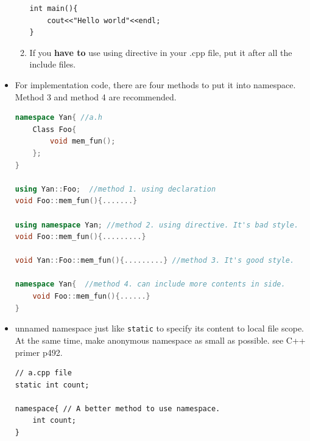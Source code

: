 \documentclass[a4paper,11pt,twoside]{book}
\begin{document}
\begin{itemize}
\begin{enumerate}
\begin{lstlisting}[numbers=none]
int main(){
	cout<<"Hello world"<<endl;
}	
\end{lstlisting}	
	
	\item If you \textbf{have to} use using directive in your .cpp file, put it after all the include files.

		\end{enumerate}
	
	\item For implementation code, there are four methods to put it into namespace. Method 3 and method 4 are recommended.
	
\begin{lstlisting}[frame=single, language=c++]
namespace Yan{ //a.h
	Class Foo{
		void mem_fun();
	};
}
	
using Yan::Foo;  //method 1. using declaration
void Foo::mem_fun(){.......}
	
using namespace Yan; //method 2. using directive. It's bad style.
void Foo::mem_fun(){.........}
	
void Yan::Foo::mem_fun(){.........} //method 3. It's good style.

namespace Yan{  //method 4. can include more contents in side.
	void Foo::mem_fun(){......}
}
\end{lstlisting}

	
	
	\item unnamed namespace just like \texttt{static} to specify its content to local file scope. At the same time, make anonymous namespace as small as possible.  see C++ primer p492.
	
\begin{lstlisting}[numbers=none]
// a.cpp file
static int count;

namespace{ // A better method to use namespace.
	int count;
}
\end{lstlisting}
	
\end{itemize}
\end{document}
